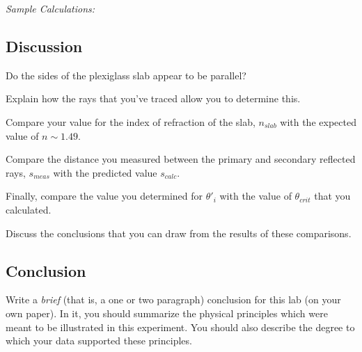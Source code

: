 {\it Sample Calculations:}
\newpage


\subsection{Discussion}



\noindent
Do the sides of the plexiglass slab appear to be parallel?
\vspace*{.3cm}

\noindent
Explain how the rays that you've traced allow you to determine this.
\vspace*{1.8cm}

\noindent
Compare your value for the index of refraction of the slab, $n_{slab}$ with the
expected value of $n \sim 1.49.$ 
\vspace*{1.4cm}

\noindent 
Compare the distance you measured between the primary and secondary reflected rays,
$s_{meas}$ with the predicted value $s_{calc}.$
\vspace*{1.4cm}

\noindent
Finally, compare the value you determined for $\theta '_i$ with the value of 
$\theta _{crit}$ that you calculated.
\vspace*{1.4cm}

\noindent
Discuss the conclusions that you can draw from the results of these comparisons.
\vspace*{2.5cm}

\subsection{Conclusion}

Write a {\it brief} (that is, a one or two paragraph) conclusion for this lab (on your
own paper). In it, you should summarize the physical principles which were meant to be
illustrated in this experiment. You should also describe the degree to which your data
supported these principles.



\renewcommand{\thesection}{\thechapter.\arabic{section}}





